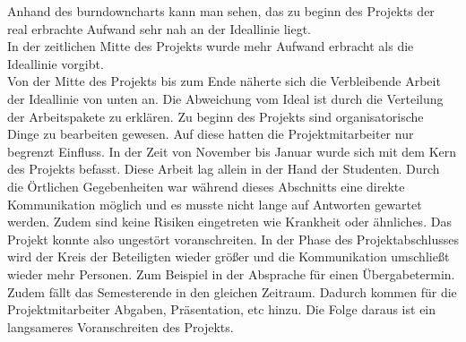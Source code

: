 \documentclass[ThesisDJ.tex]{subfiles}
\begin{document}
Anhand des burndowncharts kann man sehen, das zu beginn des Projekts der real erbrachte Aufwand sehr nah an der Ideallinie liegt.\\
In der zeitlichen Mitte des Projekts wurde mehr Aufwand erbracht als die Ideallinie vorgibt.\\
Von der Mitte des Projekts bis zum Ende näherte sich die Verbleibende Arbeit der Ideallinie von unten an.
Die Abweichung vom Ideal ist durch die Verteilung der Arbeitspakete zu erklären. Zu beginn des Projekts sind organisatorische Dinge zu bearbeiten gewesen. Auf diese hatten die Projektmitarbeiter nur begrenzt Einfluss. In der Zeit von November bis Januar wurde sich mit dem Kern des Projekts befasst. Diese Arbeit lag allein in der Hand der Studenten. Durch die Örtlichen Gegebenheiten war während dieses Abschnitts eine direkte Kommunikation möglich und es musste nicht lange auf Antworten gewartet werden. Zudem sind keine Risiken eingetreten wie Krankheit oder ähnliches. Das Projekt konnte also ungestört voranschreiten. 
In der Phase des Projektabschlusses wird der Kreis der Beteiligten wieder größer und die Kommunikation umschließt wieder mehr Personen. Zum Beispiel in der Absprache für einen Übergabetermin. Zudem fällt das Semesterende in den gleichen Zeitraum. Dadurch kommen für die Projektmitarbeiter Abgaben, Präsentation, etc hinzu. Die Folge daraus ist ein langsameres Voranschreiten des Projekts. 
\end{document}

